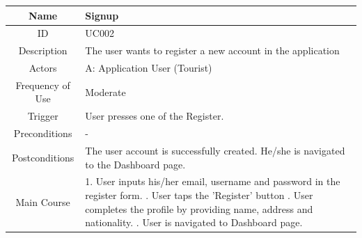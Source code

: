 \documentclass[12pt, a4paper, oneside]{article}
\begin{document}
\begin{table}[H]
\begin{tabularx}{\linewidth}{|c|X|}
\hline
Name                & Signup                                                                                                                                                                                                                      \\ \hline
ID                  & UC002                                                                                                                                                                                                                       \\ \hline
Description         & The user wants to register a new account in the application                                                                                                                                                                 \\ \hline
Actors              & A: Application User (Tourist)                                                                                                                                                                                                  \\ \hline
Frequency of Use    & Moderate                                                                                                                                                                                                                    \\ \hline
Trigger             & User presses one of the Register.                                                                                                                                                                                           \\ \hline
Preconditions       & -                                                                                                                                                                                                                           \\ \hline
Postconditions      & The user account is successfully created. \newline He/she is navigated to the Dashboard page.                                                                                                                                         \\ \hline
Main Course         & 1. User inputs his/her email, username and password in the register form. \newline 2. User taps the 'Register' button \newline 3. User completes the profile by providing name, address and nationality. \newline 4. User is navigated to Dashboard page. \\ \hline

\end{tabularx}
\end{table}
\end{document}

